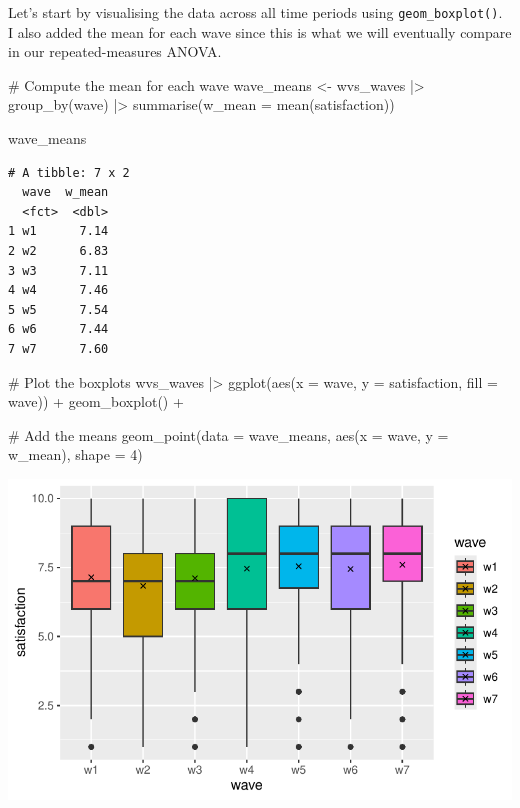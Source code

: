 \documentclass[
  letterpaper,
]{krantz}
\makeatletter
\newenvironment{Shaded}{\begin{snugshade}}{\end{snugshade}}
\newcommand{\AttributeTok}[1]{\textcolor[rgb]{0.40,0.45,0.13}{#1}}
\newcommand{\CommentTok}[1]{\textcolor[rgb]{0.37,0.37,0.37}{#1}}
\newcommand{\DecValTok}[1]{\textcolor[rgb]{0.68,0.00,0.00}{#1}}
\newcommand{\FunctionTok}[1]{\textcolor[rgb]{0.28,0.35,0.67}{#1}}
\newcommand{\NormalTok}[1]{\textcolor[rgb]{0.00,0.23,0.31}{#1}}
\newcommand{\OtherTok}[1]{\textcolor[rgb]{0.00,0.23,0.31}{#1}}
\newcommand{\SpecialCharTok}[1]{\textcolor[rgb]{0.37,0.37,0.37}{#1}}
\newenvironment{kframe}{%
\medskip{}
\setlength{\fboxsep}{.8em}
 \def\at@end@of@kframe{}%
 \ifinner\ifhmode%
  \def\at@end@of@kframe{\end{minipage}}%
  \begin{minipage}{\columnwidth}%
 \fi\fi%
 \def\FrameCommand##1{\hskip\@totalleftmargin \hskip-\fboxsep
 \colorbox{shadecolor}{##1}\hskip-\fboxsep
     \hskip-\linewidth \hskip-\@totalleftmargin \hskip\columnwidth}%
 \MakeFramed {\advance\hsize-\width
   \@totalleftmargin\z@ \linewidth\hsize
   \@setminipage}}%
 {\par\unskip\endMakeFramed%
 \at@end@of@kframe}
\renewenvironment{Shaded}{\begin{kframe}}{\end{kframe}}
\makeatother
\begin{document}
Let's start by visualising the data across all time periods using
\texttt{geom\_boxplot()}. I also added the mean for each wave since this
is what we will eventually compare in our repeated-measures ANOVA.

\begin{Shaded}
\begin{Highlighting}[]
\CommentTok{\# Compute the mean for each wave}
\NormalTok{wave\_means }\OtherTok{\textless{}{-}}
\NormalTok{  wvs\_waves }\SpecialCharTok{|\textgreater{}}
  \FunctionTok{group\_by}\NormalTok{(wave) }\SpecialCharTok{|\textgreater{}}
  \FunctionTok{summarise}\NormalTok{(}\AttributeTok{w\_mean =} \FunctionTok{mean}\NormalTok{(satisfaction))}

\NormalTok{wave\_means}
\end{Highlighting}
\end{Shaded}

\begin{verbatim}
# A tibble: 7 x 2
  wave  w_mean
  <fct>  <dbl>
1 w1      7.14
2 w2      6.83
3 w3      7.11
4 w4      7.46
5 w5      7.54
6 w6      7.44
7 w7      7.60
\end{verbatim}

\begin{Shaded}
\begin{Highlighting}[]
\CommentTok{\# Plot the boxplots}
\NormalTok{wvs\_waves }\SpecialCharTok{|\textgreater{}}
  \FunctionTok{ggplot}\NormalTok{(}\FunctionTok{aes}\NormalTok{(}\AttributeTok{x =}\NormalTok{ wave,}
             \AttributeTok{y =}\NormalTok{ satisfaction,}
             \AttributeTok{fill =}\NormalTok{ wave)) }\SpecialCharTok{+}
  \FunctionTok{geom\_boxplot}\NormalTok{() }\SpecialCharTok{+}

  \CommentTok{\# Add the means}
  \FunctionTok{geom\_point}\NormalTok{(}\AttributeTok{data =}\NormalTok{ wave\_means,}
             \FunctionTok{aes}\NormalTok{(}\AttributeTok{x =}\NormalTok{ wave,}
                 \AttributeTok{y =}\NormalTok{ w\_mean),}
             \AttributeTok{shape =} \DecValTok{4}\NormalTok{)}
\end{Highlighting}
\end{Shaded}

\includegraphics{11_group_comparison_files/figure-pdf/multiple-paired-groups-boxplots-1.pdf}
\end{document}
